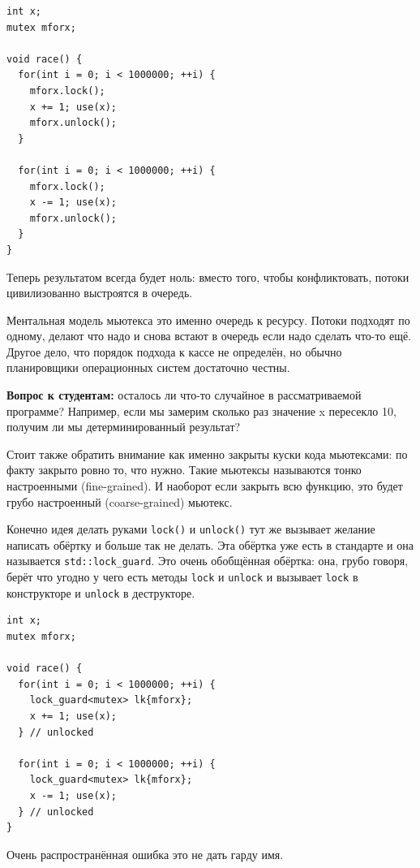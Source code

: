 \documentclass[a4paper,12pt,oneside]{book}
\newif\ifanswers
\begin{document}
\begin{lstlisting}
int x;
mutex mforx;

void race() {
  for(int i = 0; i < 1000000; ++i) {
    mforx.lock();  
    x += 1; use(x);
    mforx.unlock();
  }

  for(int i = 0; i < 1000000; ++i) {
    mforx.lock();  
    x -= 1; use(x);
    mforx.unlock();
  }
}
\end{lstlisting}

Теперь результатом всегда будет ноль: вместо того, чтобы конфликтовать, потоки цивилизованно выстроятся в очередь.

Ментальная модель мьютекса это именно очередь к ресурсу. Потоки подходят по одному, делают что надо и снова встают в очередь если надо сделать что-то ещё. Другое дело, что порядок подхода к кассе не определён, но обычно планировщики операционных систем достаточно честны.

\textbf{Вопрос к студентам:} осталось ли что-то случайное в рассматриваемой программе? Например, если мы замерим сколько раз значение x пересекло 10, получим ли мы детерминированный результат?

\ifanswers
Правильный ответ: как мерить. В общем случае нет, но вопрос можно истрактовать и так, что получается да.
\fi 

Стоит также обратить внимание как именно закрыты куски кода мьютексами: по факту закрыто ровно то, что нужно. Такие мьютексы называются тонко настроенными (fine-grained). И наоборот если закрыть всю функцию, это будет грубо настроенный (coarse-grained) мьютекс.

Конечно идея делать руками \lstinline!lock()! и \lstinline!unlock()! тут же вызывает желание написать обёртку и больше так не делать. Эта обёртка уже есть в стандарте и она называется \lstinline!std::lock_guard!. Это очень обобщённая обёртка: она, грубо говоря, берёт что угодно у чего есть методы \lstinline!lock! и \lstinline!unlock! и вызывает \lstinline!lock! в конструкторе и \lstinline!unlock! в деструкторе.

\begin{lstlisting}
int x;
mutex mforx;

void race() {
  for(int i = 0; i < 1000000; ++i) {
    lock_guard<mutex> lk{mforx};  
    x += 1; use(x);
  } // unlocked

  for(int i = 0; i < 1000000; ++i) {
    lock_guard<mutex> lk{mforx};  
    x -= 1; use(x);
  } // unlocked
}
\end{lstlisting}

Очень распространённая ошибка это не дать гарду имя.
\end{document}
